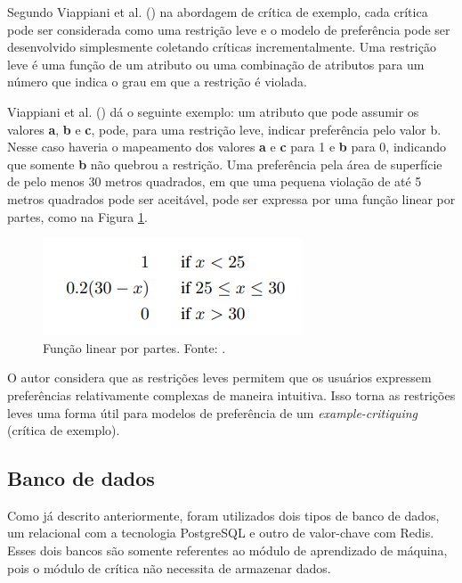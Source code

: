 Segundo Viappiani et al. (\citeyear{Viappiani}) na abordagem de crítica de exemplo, cada crítica pode ser considerada como uma restrição leve e o modelo de preferência pode ser desenvolvido simplesmente coletando críticas incrementalmente. Uma restrição leve é uma função de um atributo ou uma combinação de atributos para um número que indica o grau em que a restrição é violada.

Viappiani et al. (\citeyear{Viappiani}) dá o seguinte exemplo: um atributo que pode assumir os valores \textbf{a}, \textbf{b} e \textbf{c}, pode, para uma restrição leve, indicar preferência pelo valor b. Nesse caso haveria o mapeamento dos valores \textbf{a} e \textbf{c} para 1 e \textbf{b} para 0, indicando que somente \textbf{b} não quebrou a restrição. Uma preferência pela área de superfície de pelo menos 30 metros quadrados, em que uma pequena violação de até 5 metros quadrados pode ser aceitável, pode ser expressa por uma função linear por partes, como na Figura \ref{fig:funcao_linear}.

\begin{figure}[H]
    \centering
    \includegraphics[scale=0.8]{figuras/proposta/funcao_linear.png}
    \caption[Função linear por partes]{Função linear por partes. Fonte: \cite{Viappiani}.}
    \label{fig:funcao_linear}
\end{figure}

O autor considera que as restrições leves permitem que os usuários expressem preferências relativamente complexas de maneira intuitiva. Isso torna as restrições leves uma forma útil para modelos de preferência de um \textit{example-critiquing} (crítica de exemplo).

\subsection{Banco de dados}

Como já descrito anteriormente, foram utilizados dois tipos de banco de dados, um relacional com a tecnologia PostgreSQL e outro de valor-chave com Redis. Esses dois bancos são somente referentes ao módulo de aprendizado de máquina, pois o módulo de crítica não necessita de armazenar dados.

